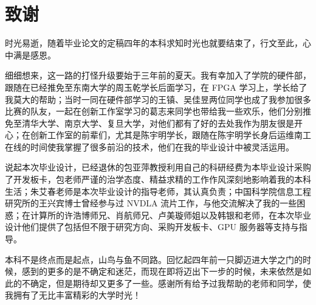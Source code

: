 \chapter[致谢]{致\quad 谢}%
\thispagestyle{noheaderstyle}%

时光易逝，随着毕业论文的定稿四年的本科求知时光也就要结束了，行文至此，心中满是感恩。

细细想来，这一路的打怪升级要始于三年前的夏天。我有幸加入了学院的硬件部，跟随在已经推免至东南大学的周玉乾学长后面学习，在 FPGA 学习上，学长给了我莫大的帮助；当时一同在硬件部学习的王镇、吴佳昱两位同学也成了我参加很多比赛的队友，一起在创新工作室学习的葛志来同学也带给我一些欢乐，他们分别推免至清华大学、南京大学、复旦大学，对他们都有了好的去处我作为朋友很是开心；在创新工作室的前辈们，尤其是陈宇明学长，跟随在陈宇明学长身后运维南工在线的时间使我掌握了很多前沿的技术，他们在我的毕业设计中被灵活运用。

说起本次毕业设计，已经退休的包亚萍教授利用自己的科研经费为本毕业设计采购了开发板卡，包老师严谨的治学态度、精益求精的工作作风深刻地影响着我的本科生活；朱艾春老师是本次毕业设计的指导老师，其认真负责；中国科学院信息工程研究所的王兴宾博士曾经参与过 NVDLA 流片工作，与他交流解决了我的一些困惑；在计算所的许浩博师兄、肖航师兄、卢美璇师姐以及韩银和老师，在本次毕业设计他们提供了包括但不限于研究方向、采购开发板卡、GPU 服务器等支持与指导。

本科不是终点而是起点，山鸟与鱼不同路。回忆起四年前一只脚迈进大学之门的时候，感到的更多的是不确定和迷茫，而现在即将迈出下一步的时候，未来依然是如此的不确定，但是期待却又更多了一些。感谢所有给予过我帮助的老师和同学，使我拥有了无比丰富精彩的大学时光！

\cleardoublepage[plain]%
